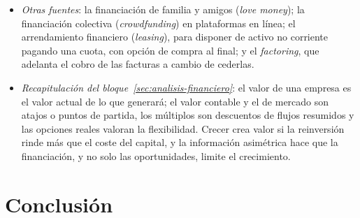 \documentclass[11pt]{article}
\begin{document}
\begin{anotaciones}
\begin{itemize}
\begin{itemize}
  \end{itemize}
\item \emph{Otras fuentes}: la financiación de familia y amigos (\emph{love money}); la financiación colectiva (\emph{crowdfunding}) en plataformas en línea; el arrendamiento financiero (\emph{leasing}), para disponer de activo no corriente pagando una cuota, con opción de compra al final; y el \emph{factoring}, que adelanta el cobro de las facturas a cambio de cederlas.
\end{itemize}
\end{anotaciones}

\begin{itemize}
\item \emph{Recapitulación del bloque~\ref{sec:analisis-financiero}}: el valor de una empresa es el valor actual de lo que generará; el valor contable y el de mercado son atajos o puntos de partida, los múltiplos son descuentos de flujos resumidos y las opciones reales valoran la flexibilidad. Crecer crea valor si la reinversión rinde más que el coste del capital, y la información asimétrica hace que la financiación, y no solo las oportunidades, limite el crecimiento.
\end{itemize}

\section*{Conclusión}
\end{document}
